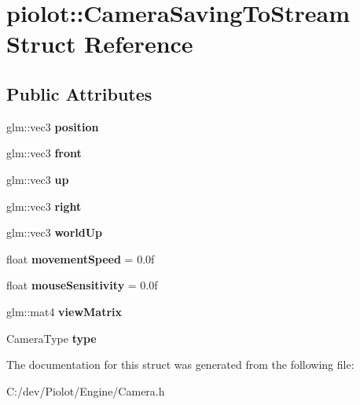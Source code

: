 \hypertarget{structpiolot_1_1_camera_saving_to_stream}{}\section{piolot\+:\+:Camera\+Saving\+To\+Stream Struct Reference}
\label{structpiolot_1_1_camera_saving_to_stream}
\subsection*{Public Attributes}
\begin{DoxyCompactItemize}
\item 
\mbox{\label{structpiolot_1_1_camera_saving_to_stream_a04a032f3c0e8cd93881ce17213bbf4bd}} 
glm\+::vec3 {\bfseries position}
\item 
\mbox{\label{structpiolot_1_1_camera_saving_to_stream_abe0eb65d9c73092e1568f84db1a2aee5}} 
glm\+::vec3 {\bfseries front}
\item 
\mbox{\label{structpiolot_1_1_camera_saving_to_stream_a43f2e1bbaaf6bc3b5ccebbe413b25971}} 
glm\+::vec3 {\bfseries up}
\item 
\mbox{\label{structpiolot_1_1_camera_saving_to_stream_a7fcc0104c11130ecab709a89768c502c}} 
glm\+::vec3 {\bfseries right}
\item 
\mbox{\label{structpiolot_1_1_camera_saving_to_stream_acafc5157ece98eb00acf67acb5b66c88}} 
glm\+::vec3 {\bfseries world\+Up}
\item 
\mbox{\label{structpiolot_1_1_camera_saving_to_stream_ad61906be234d7d739202791be26a2da0}} 
float {\bfseries movement\+Speed} = 0.\+0f
\item 
\mbox{\label{structpiolot_1_1_camera_saving_to_stream_aef4782e4042bf00c1bb25e9d22fe3ae1}} 
float {\bfseries mouse\+Sensitivity} = 0.\+0f
\item 
\mbox{\label{structpiolot_1_1_camera_saving_to_stream_a4baad4cac5a766612ef07e244670b7cc}} 
glm\+::mat4 {\bfseries view\+Matrix}
\item 
\mbox{\label{structpiolot_1_1_camera_saving_to_stream_a1c07deec7b00d9a0fcaa9a5faf316981}} 
Camera\+Type {\bfseries type}
\end{DoxyCompactItemize}


The documentation for this struct was generated from the following file\+:\begin{DoxyCompactItemize}
\item 
C\+:/dev/\+Piolot/\+Engine/Camera.\+h\end{DoxyCompactItemize}
